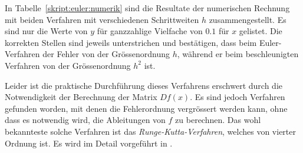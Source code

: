 In Tabelle~\ref{skript:euler:numerik} sind die Resultate der numerischen
Rechnung mit beiden Verfahren mit verschiedenen Schrittweiten $h$
zusammengestellt.
Es sind nur die Werte von $y$ für ganzzahlige Vielfache von $0.1$
für $x$ gelistet.
Die korrekten Stellen sind jeweils unterstrichen und bestätigen, dass
beim Euler-Verfahren der Fehler von der Grössenordnung $h$, während
er beim beschleunigten Verfahren von der Grössenordnung $h^2$ ist.

Leider ist die praktische Durchführung dieses Verfahrens erschwert durch
die Notwendigkeit der Berechnung der Matrix $Df(x)$.
Es sind jedoch Verfahren gefunden worden, mit denen die Fehlerordnung
vergrössert werden kann, ohne dass es notwendig wird, die Ableitungen
von $f$ zu berechnen.
Das wohl bekannteste solche Verfahren ist das {\em Runge-Kutta-Verfahren},
welches von vierter Ordnung ist.
Es wird im Detail vorgeführt in \cite{skript:mathsem-dgl}.



